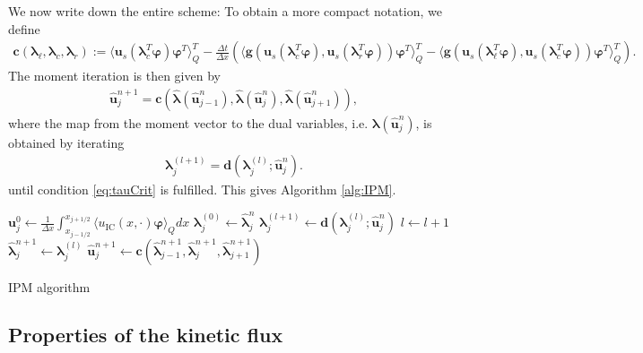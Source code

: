 We now write down the entire scheme: To obtain a more compact notation, we define
\begin{align}\label{eq:momentIterationFunction}
\bm{c}\left(\bm{\lambda}_{\ell},\bm{\lambda}_c,\bm{\lambda}_r\right):= \langle \bm u_{s}(\bm{\lambda}_c^T\bm{\varphi})\bm{\varphi}^T\rangle_Q^T - \frac{\Delta t}{\Delta x}\left(\langle \bm g(\bm u_{s}(\bm{\lambda}_c^T\bm{\varphi}),\bm u_{s}(\bm{\lambda}_r^T\bm{\varphi}))\bm{\varphi}^T\rangle_Q^T-\langle \bm g(\bm u_{s}(\bm{\lambda}_{\ell}^T\bm{\varphi}),\bm u_{s}(\bm{\lambda}_c^T\bm{\varphi}))\bm{\varphi}^T\rangle_Q^T\right).
\end{align}
The moment iteration is then given by
\begin{align}\label{eq:momentIteration}
\bm{\hat u}_j^{n+1} = \bm{c}\left(\bm{\hat\lambda}(\bm{\hat u}_{j-1}^n),\bm{\hat\lambda}(\bm{\hat u}_{j}^n),\bm{\hat\lambda}(\bm{\hat u}_{j+1}^n)\right),
\end{align}
where the map from the moment vector to the dual variables, i.e. $\bm{\lambda}(\bm{\hat u}_{j}^n)$, is obtained by iterating
\begin{align}\label{eq:dualIteration}
\bm{\lambda}_j^{(l+1)} = \bm{d}(\bm{\lambda}_{j}^{(l)};\bm{\hat u}_j^{n}).
\end{align}
until condition \eqref{eq:tauCrit} is fulfilled. This gives Algorithm \ref{alg:IPM}.

\begin{algorithm}[H]
\begin{algorithmic}[1]
\State $\bm{u}_j^0 \leftarrow \frac{1}{\Delta x} \int_{x_{j-1/ 2}}^{x_{j+1/ 2}} \langle u_{\text{IC}}(x, \cdot) \bm{\varphi} \rangle_Q dx$
\EndFor
{}
\State $\bm{\lambda}_j^{(0)} \leftarrow \bm{\hat \lambda}_j^{n}$
\State $\bm{\lambda}_j^{(l+1)} \leftarrow \bm{d}(\bm{\lambda}_{j}^{(l)};\bm{\hat u}_j^{n})$
\State $l \leftarrow l+1$
\EndWhile
\State $\bm{\hat \lambda}_j^{n+1} \leftarrow \bm{\lambda}_j^{(l)}$
\EndFor
{}
\State $\bm{\hat u}_j^{n+1} \leftarrow \bm{c}(\bm{\hat \lambda}_{j-1}^{n+1},\bm{\hat \lambda}_j^{n+1},\bm{\hat \lambda}_{j+1}^{n+1})$
\EndFor
\EndFor
\end{algorithmic}
\caption{IPM algorithm}
\label{alg:IPM}
\end{algorithm}

\subsection{Properties of the kinetic flux}
\label{sec:costNumFlux}

